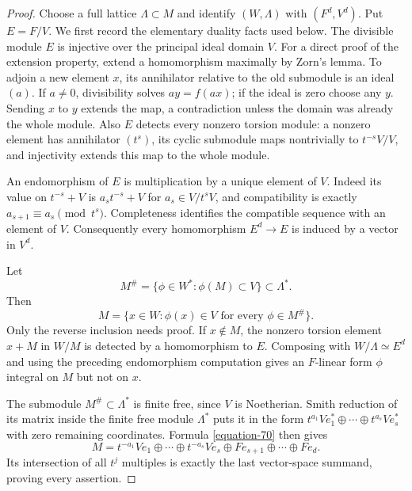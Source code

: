 \documentclass[11pt,a4paper]{article}
\theoremstyle{definition}
\begin{document}
\begin{proof}
Choose a full lattice $\Lambda\subset M$ and identify
$(W,\Lambda)$ with $(F^d,V^d)$. Put $E=F/V$.
We first record the elementary duality facts used below.
The divisible module $E$ is injective over the principal
ideal domain $V$. For a direct proof of the extension
property, extend a homomorphism maximally by Zorn's
lemma. To adjoin a new element $x$, its annihilator
relative to the old submodule is an ideal $(a)$.
If $a\ne0$, divisibility solves $ay=f(ax)$; if the
ideal is zero choose any $y$. Sending $x$ to $y$
extends the map, a contradiction unless the domain was
already the whole module.
Also $E$ detects every nonzero torsion module: a nonzero
element has annihilator $(t^s)$, its cyclic submodule
maps nontrivially to $t^{-s}V/V$, and injectivity extends
this map to the whole module.

An endomorphism of $E$ is multiplication by a unique
element of $V$. Indeed its value on $t^{-s}+V$ is
$a_s t^{-s}+V$ for $a_s\in V/t^sV$, and compatibility
is exactly $a_{s+1}\equiv a_s\pmod {t^s}$. Completeness
identifies the compatible sequence with an element of
$V$. Consequently every homomorphism $E^d\to E$
is induced by a vector in $V^d$.

Let
\[
 M^\#=\{\phi\in W^*: \phi(M)\subset V\}
                                      \subset\Lambda^*.
\]
Then
\begin{equation}
 M=\{x\in W: \phi(x)\in V\text{ for every }
                                      \phi\in M^\#\}.       \label{equation-70}
\end{equation}
Only the reverse inclusion needs proof. If $x\notin M$,
the nonzero torsion element $x+M$ in $W/M$ is detected
by a homomorphism to $E$. Composing with
$W/\Lambda\simeq E^d$ and using the preceding
endomorphism computation gives an $F$-linear form
$\phi$ integral on $M$ but not on $x$.

The submodule $M^\#\subset\Lambda^*$ is finite free,
since $V$ is Noetherian. Smith reduction of its matrix
inside the finite free module $\Lambda^*$ puts it in
the form
$t^{a_1}Ve_1^*\oplus\cdots\oplus t^{a_s}Ve_s^*$
with zero remaining coordinates. Formula \eqref{equation-70}
then gives
\[
 M=t^{-a_1}Ve_1\oplus\cdots\oplus t^{-a_s}Ve_s
           \oplus Fe_{s+1}\oplus\cdots\oplus Fe_d.
\]
Its intersection of all $t^j$ multiples is exactly the
last vector-space summand, proving every assertion.
\end{proof}
\end{document}
